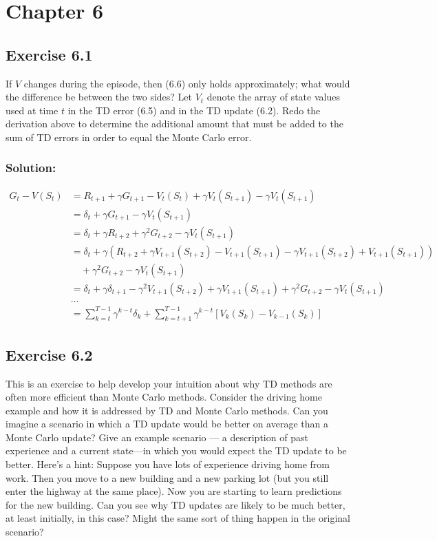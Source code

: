 \section*{Chapter 6}

\subsection*{Exercise 6.1}
If $V$ changes during the episode, then (6.6) only holds approximately; what
would the difference be between the two sides? Let $V_t$ denote the array of state values
used at time $t$ in the TD error (6.5) and in the TD update (6.2). Redo the derivation
above to determine the additional amount that must be added to the sum of TD errors
in order to equal the Monte Carlo error. 

\subsubsection*{Solution:}

\begin{align*}
G_t - V(S_t) &= R_{t+1} + \gamma G_{t+1} - V_t(S_t) + \gamma V_{t}(S_{t+1}) - \gamma V_{t}(S_{t+1}) \\
&= \delta_t + \gamma G_{t+1} - \gamma V_t(S_{t+1}) \\
&= \delta_t + \gamma R_{t+2} + \gamma^2 G_{t+2} - \gamma V_{t}(S_{t+1}) \\
&= \delta_t + \gamma (R_{t+2} + \gamma V_{t+1}(S_{t+2}) - V_{t+1}(S_{t+1}) - \gamma V_{t+1}(S_{t+2}) + V_{t+1}(S_{t+1}))\\
& \quad + \gamma^2 G_{t+2} - \gamma V_{t}(S_{t+1}) \\
&= \delta_t + \gamma \delta_{t+1} - \gamma^2 V_{t+1}(S_{t+2}) + \gamma V_{t+1}(S_{t+1}) + \gamma^2 G_{t+2} - \gamma V_{t}(S_{t+1})\\
& \dots \\
&= \sum_{k=t}^{T-1} \gamma^{k-t} \delta_k + \sum_{k=t+1}^{T-1} \gamma^{k-t } \left[V_{k}(S_{k}) - V_{k-1}(S_{k}) \right]
\end{align*}


\subsection*{Exercise 6.2}
This is an exercise to help develop your intuition about why TD methods
are often more efficient than Monte Carlo methods. Consider the driving home example
and how it is addressed by TD and Monte Carlo methods. Can you imagine a scenario
in which a TD update would be better on average than a Monte Carlo update? Give
an example scenario — a description of past experience and a current state—in which
you would expect the TD update to be better. Here's a hint: Suppose you have lots
of experience driving home from work. Then you move to a new building and a new
parking lot (but you still enter the highway at the same place). Now you are starting
to learn predictions for the new building. Can you see why TD updates are likely to be
much better, at least initially, in this case? Might the same sort of thing happen in the
original scenario?

